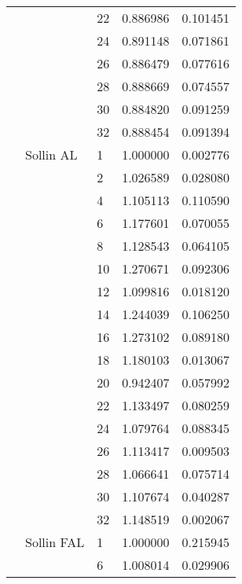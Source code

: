 \begin{tabular}{lllrr}
                      &            & 22 &  0.886986 &  0.101451 \\
                      &            & 24 &  0.891148 &  0.071861 \\
                      &            & 26 &  0.886479 &  0.077616 \\
                      &            & 28 &  0.888669 &  0.074557 \\
                      &            & 30 &  0.884820 &  0.091259 \\
                      &            & 32 &  0.888454 &  0.091394 \\
                      & Sollin AL & 1  &  1.000000 &  0.002776 \\
                      &            & 2  &  1.026589 &  0.028080 \\
                      &            & 4  &  1.105113 &  0.110590 \\
                      &            & 6  &  1.177601 &  0.070055 \\
                      &            & 8  &  1.128543 &  0.064105 \\
                      &            & 10 &  1.270671 &  0.092306 \\
                      &            & 12 &  1.099816 &  0.018120 \\
                      &            & 14 &  1.244039 &  0.106250 \\
                      &            & 16 &  1.273102 &  0.089180 \\
                      &            & 18 &  1.180103 &  0.013067 \\
                      &            & 20 &  0.942407 &  0.057992 \\
                      &            & 22 &  1.133497 &  0.080259 \\
                      &            & 24 &  1.079764 &  0.088345 \\
                      &            & 26 &  1.113417 &  0.009503 \\
                      &            & 28 &  1.066641 &  0.075714 \\
                      &            & 30 &  1.107674 &  0.040287 \\
                      &            & 32 &  1.148519 &  0.002067 \\
                      & Sollin FAL & 1  &  1.000000 &  0.215945 \\
                      &            & 6  &  1.008014 &  0.029906 \\

\end{tabular}
